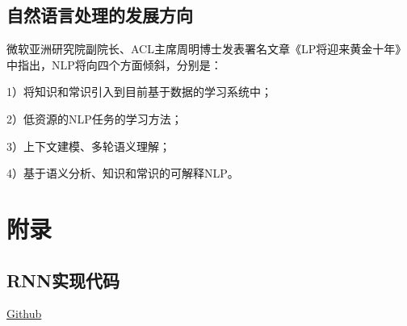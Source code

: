 \documentclass{article}
\begin{document}
\subsection{自然语言处理的发展方向}
微软亚洲研究院副院长、ACL主席周明博士发表署名文章《LP将迎来黄金十年》中指出，NLP将向四个方面倾斜，分别是：\par
1）将知识和常识引入到目前基于数据的学习系统中；\par 
2）低资源的NLP任务的学习方法；\par 
3）上下文建模、多轮语义理解；\par 
4）基于语义分析、知识和常识的可解释NLP。

\section{附录}
\subsection{RNN实现代码}
\href{https://github.com/hellopteromyini/RNN-Based-on-TF/tree/master}{Github}
\end{document}
